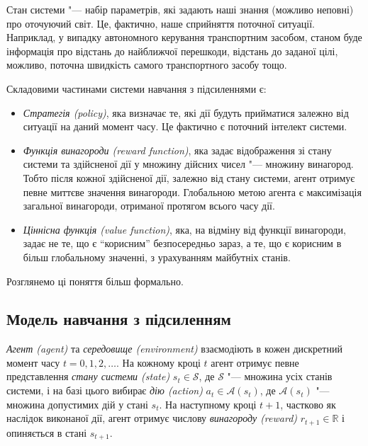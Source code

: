 Стан системи "--- набір параметрів, які задають наші знання (можливо неповні) про
оточуючий світ. Це, фактично, наше сприйняття поточної ситуації.
Наприклад, у випадку автономного керування транспортним засобом, станом буде інформація про
відстань до найближчої перешкоди, відстань до заданої цілі, можливо, поточна
швидкість самого транспортного засобу тощо.

Складовими частинами системи навчання з підсиленнями є:
\begin{itemize}
\item \emph{Стратегія (policy)}, яка визначає те, які дії будуть прийматися
залежно від ситуації на даний момент часу. Це фактично є поточний інтелект
системи.
\item \emph{Функція винагороди (reward function)}, яка задає відображення зі стану системи та здійсненої дії у множину дійсних чисел "--- множину винагород. Тобто після кожної здійсненої дії, залежно від стану системи, агент отримує певне миттєве значення винагороди. Глобальною метою агента є максимізація загальної винагороди, отриманої протягом всього часу дії.
\item \emph{Ціннісна функція (value function)}, яка, на відміну від функції
винагороди, задає не те, що є ``корисним'' безпосередньо зараз, а те, що є
корисним в більш глобальному значенні, з урахуванням майбутніх станів.
\end{itemize}

Розглянемо ці поняття більш формально.

\subsection{Модель навчання з підсиленням}

\emph{Агент (agent)} та \emph{середовище (environment)} взаємодіють в кожен дискретний момент часу $t=0,1,2,\dots$. На кожному кроці $t$ агент отримує певне представлення \emph{стану системи (state)} $s_t \in \mathcal{S}$, де $\mathcal{S}$ "--- множина усіх станів системи, і на базі цього вибирає \emph{дію (action)} $a_t \in \mathcal{A}(s_t)$, де $\mathcal{A}(s_t)$ "--- множина допустимих дій у стані $s_t$. На наступному кроці $t+1$, частково як наслідок виконаної дії, агент отримує числову \emph{винагороду (reward)} $r_{t+1} \in \mathbb{R}$ і опиняється в стані $s_{t+1}$.

